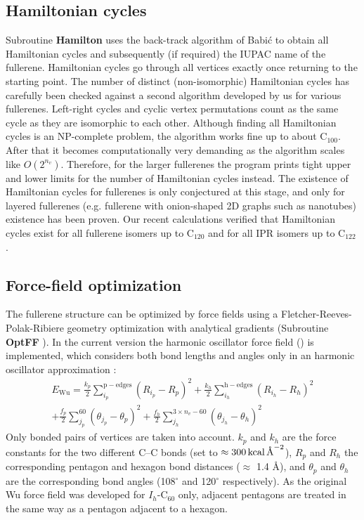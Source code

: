 \documentclass[article,a4paper,twoside]{memoir}
\let\acr=\textsmaller
\newcommand{\C}[1]{\ensuremath{\mathrm{C}_{#1}}}
\newcommand{\funname}[1]{{\color{blue}\textbf{#1}}}
\begin{document}
\subsection{Hamiltonian cycles}
Subroutine \funname{Hamilton} uses the back-track algorithm of Babi\'c \cite{Babic1995a} to obtain all 
Hamiltonian cycles and subsequently (if required) the IUPAC name of the fullerene. Hamiltonian cycles go through all vertices exactly once returning 
to the starting point. The number of distinct (non-isomorphic) Hamiltonian cycles has carefully been checked 
against a second algorithm developed by us for various fullerenes. Left-right cycles and cyclic vertex permutations count as the 
same cycle as they are isomorphic to each other. Although finding all Hamiltonian cycles is an NP-complete problem, the algorithm works fine up to about \C{100}. 
After that it becomes computationally very demanding as the algorithm scales like $O(2^{n_v})$. Therefore, for the larger fullerenes the program prints 
tight upper and lower limits for the number of Hamiltonian cycles instead. The existence of Hamiltonian cycles for fullerenes is only conjectured at this 
stage, and only for layered fullerenes (e.g. fullerene with onion-shaped 2D graphs such as nanotubes) existence has been proven. Our recent calculations verified that
Hamiltonian cycles exist for all fullerene isomers up to \C{120} and for all IPR isomers up to \C{122} \cite{PSAJDB}.

\subsection{Force-field optimization}
The fullerene structure can be optimized by force fields using a Fletcher-Reeves-Polak-Ribiere geometry optimization \cite{NumRec}
with analytical gradients (Subroutine \funname{OptFF} \cite{NumericalRecipes}). In the current version the harmonic oscillator
force field (\acr{HOFF}) is implemented, which considers both bond lengths and angles only in an harmonic oscillator approximation \cite{Wu87}: 
\begin{multline}
  \label{eq:Ewu}
  E_{\mathrm{Wu}} = 
          \frac{k_p}{2} \sum_{i_p}^{\mathrm{p-edges}} \left(R_{i_p} - R_p\right)^2 
        + \frac{k_h}{2} \sum_{i_h}^{\mathrm{h-edges}} \left(R_{i_h} - R_h\right)^2 \\
        + \frac{f_p}{2} \sum_{j_p}^{60} \left(\theta_{j_p} - \theta_p\right)^2 
        + \frac{f_h}{2} \sum_{j_h}^{3\times n_v-60} \left(\theta_{j_h} - \theta_h\right)^2 
\end{multline}
Only bonded pairs of vertices are taken into account. $k_{p}$ and $k_{h}$ are
the force constants for the two different C--C bonds (set to $\approx 300 \text{\,kcal\,\AA}^{-2}$), $R_p$ and $R_h$ the corresponding pentagon and
hexagon bond distances ($\approx$ 1.4 \AA), and $\theta_p $ and $\theta_h$ are the corresponding bond angles (108$^\circ$ and 120$^\circ$
respectively). As the original Wu force field was developed for $I_h$-\C{60} only, adjacent pentagons are treated in the same way as a pentagon adjacent to a hexagon.
\end{document}
